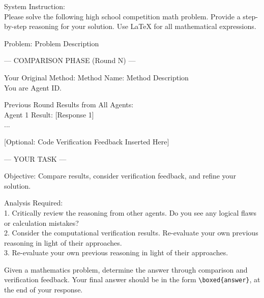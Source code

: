 \begin{tcolorbox}[
    breakable,
    colback=white,
    colframe=black,
    boxrule=0.8pt,
    left=6pt,
    right=6pt,
    top=6pt,
    bottom=6pt
]
\ttfamily\small
System Instruction:\\
Please solve the following high school competition math problem. Provide a step-by-step reasoning for your solution.
Use LaTeX for all mathematical expressions.

\vspace{0.5em}
Problem: \lbrack Problem Description\rbrack

\vspace{0.5em}
--- COMPARISON PHASE (Round N) ---

\vspace{0.25em}
Your Original Method: \lbrack Method Name\rbrack: \lbrack Method Description\rbrack\\
You are Agent \lbrack ID\rbrack.

\vspace{0.25em}
Previous Round Results from All Agents:\\
Agent 1 Result: [Response 1]\\
...

\vspace{0.25em}
[Optional: Code Verification Feedback Inserted Here]

\vspace{0.5em}
--- YOUR TASK ---

\vspace{0.25em}
Objective: Compare results, consider verification feedback, and refine your solution.

\vspace{0.25em}
Analysis Required:\\
1. Critically review the reasoning from other agents. Do you see any logical flaws or calculation mistakes?\\
2. Consider the computational verification results. Re-evaluate your own previous reasoning in light of their approaches.\\
3. Re-evaluate your own previous reasoning in light of their approaches.

\vspace{0.5em}
Given a mathematics problem, determine the answer through comparison and verification feedback.
Your final answer should be in the form \verb|\boxed{answer}|, at the end of your response.
\end{tcolorbox}
\label{fig:prompt_debate}

